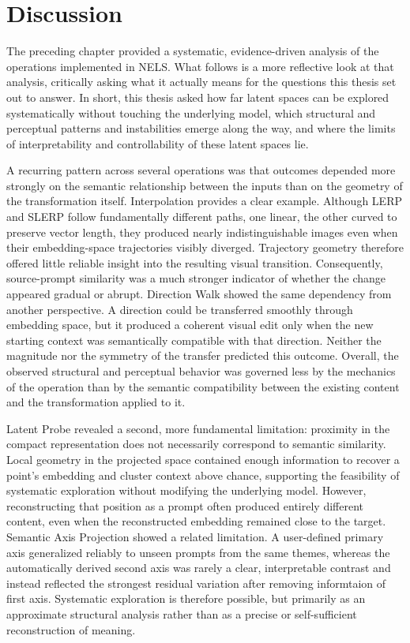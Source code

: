 \chapter{Discussion}\label{ch:discussion}

The preceding chapter provided a systematic, evidence-driven analysis of the operations implemented in NELS. What follows is a more reflective look at that analysis, critically asking what it actually means for the questions this thesis set out to answer. In short, this thesis asked how far latent spaces can be explored systematically without touching the underlying model, which structural and perceptual patterns and instabilities emerge along the way, and where the limits of interpretability and controllability of these latent spaces lie.

A recurring pattern across several operations was that outcomes depended more strongly on the semantic relationship between the inputs than on the geometry of the transformation itself. Interpolation provides a clear example. Although LERP and SLERP follow fundamentally different paths, one linear, the other curved to preserve vector length, they produced nearly indistinguishable images even when their embedding-space trajectories visibly diverged. Trajectory geometry therefore offered little reliable insight into the resulting visual transition. Consequently, source-prompt similarity was a much stronger indicator of whether the change appeared gradual or abrupt. Direction Walk showed the same dependency from another perspective. A direction could be transferred smoothly through embedding space, but it produced a coherent visual edit only when the new starting context was semantically compatible with that direction. Neither the magnitude nor the symmetry of the transfer predicted this outcome. Overall, the observed structural and perceptual behavior was governed less by the mechanics of the operation than by the semantic compatibility between the existing content and the transformation applied to it.

Latent Probe revealed a second, more fundamental limitation: proximity in the compact representation does not necessarily correspond to semantic similarity. Local geometry in the projected space contained enough information to recover a point's embedding and cluster context above chance, supporting the feasibility of systematic exploration without modifying the underlying model. However, reconstructing that position as a prompt often produced entirely different content, even when the reconstructed embedding remained close to the target. Semantic Axis Projection showed a related limitation. A user-defined primary axis generalized reliably to unseen prompts from the same themes, whereas the automatically derived second axis was rarely a clear, interpretable contrast and instead reflected the strongest residual variation after removing informtaion of first axis. Systematic exploration is therefore possible, but primarily as an approximate structural analysis rather than as a precise or self-sufficient reconstruction of meaning.


